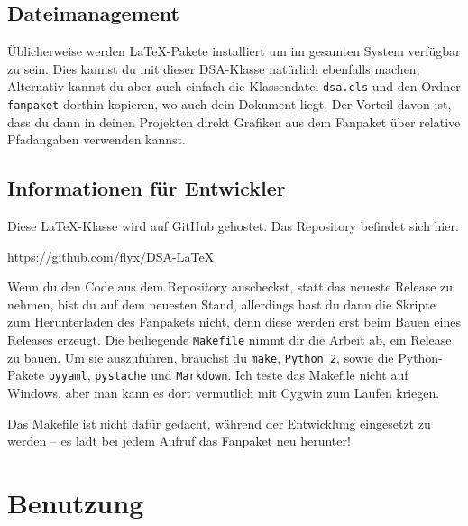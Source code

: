 \documentclass{dsa}
\begin{document}
  \subsection*{Dateimanagement}
  
  Üblicherweise werden \LaTeX-Pakete installiert um im gesamten System
  verfügbar zu sein. Dies kannst du mit dieser DSA-Klasse natürlich ebenfalls
  machen; Alternativ kannst du aber auch einfach die Klassendatei \texttt{dsa.cls}
  und den Ordner \texttt{fanpaket} dorthin kopieren, wo auch dein Dokument
  liegt. Der Vorteil davon ist, dass du dann in deinen Projekten direkt Grafiken
  aus dem Fanpaket über relative Pfadangaben verwenden kannst.
  
  \begin{dsaBoxPortrait}
    \subsection*{\normalsize Informationen für Entwickler}
    
    Diese LaTeX-Klasse wird auf GitHub gehostet. Das Repository befindet sich
    hier:
    
    \url{https://github.com/flyx/DSA-LaTeX}
    
    Wenn du den Code aus dem Repository aus\-checkst, statt das neueste
    Release zu nehmen, bist du auf dem neuesten Stand, allerdings hast du
    dann die Skripte zum Herunterladen des Fanpakets nicht, denn diese werden
    erst beim Bauen eines Releases erzeugt. Die beiliegende \texttt{Makefile}
    nimmt dir die Arbeit ab, ein Release zu bauen. Um sie auszuführen, brauchst
    du \texttt{make}, \texttt{Python 2}, sowie die Python-Pakete
    \texttt{pyyaml}, \texttt{pystache} und \texttt{Markdown}. Ich teste das
    Makefile nicht auf Windows, aber man kann es dort vermutlich mit
    Cygwin zum Laufen kriegen. 
    
    Das Makefile ist nicht dafür gedacht, während der Entwicklung eingesetzt
    zu werden – es lädt bei jedem Aufruf das Fanpaket neu herunter!
    
  \end{dsaBoxPortrait}
  
  
  \onecolumn
  
  \section*{Benutzung}
  
\end{document}
